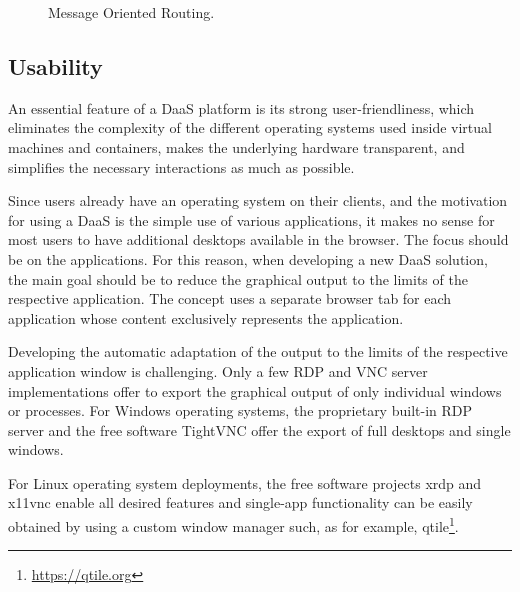 \documentclass[runningheads]{llncs}
\begin{document}
\begin{figure}
\begin{adjustbox}{width=\textwidth}
	\end{adjustbox}
	\caption{Message Oriented Routing.}\label{message_routing}
\end{figure}

\subsection{Usability}
An essential feature of a DaaS platform is its strong user-friendliness,
which eliminates the complexity of the different operating systems
used inside virtual machines and containers,
makes the underlying hardware transparent,
and simplifies the necessary interactions as much as possible.

Since users already have an operating system on their clients,
and the motivation for using a DaaS is the simple use of various applications,
it makes no sense for most users to have additional desktops available in the browser.
The focus should be on the applications.
For this reason, when developing a new DaaS solution,
the main goal should be to reduce the graphical output
to the limits of the respective application.
The concept uses a separate browser tab for each application
whose content exclusively represents the application.

Developing the automatic adaptation of the output
to the limits of the respective application window is challenging.
Only a few RDP and VNC server implementations offer to export the graphical output
of only individual windows or processes.
For Windows operating systems, the proprietary built-in RDP server
and the free software TightVNC offer the export of full desktops and single windows.

For Linux operating system deployments,
the free software projects xrdp and x11vnc enable all desired features
and single-app functionality can be easily obtained
by using a custom window manager such,
as for example, qtile\footnote{\url{https://qtile.org}}.
\end{document}

